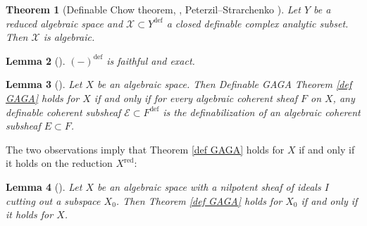 \documentclass{amsart}
\newtheorem{theorem}{Theorem}[section]
\newtheorem{lemma}[theorem]{Lemma}
\theoremstyle{definition}
\numberwithin{equation}{section}
\newcommand{\definable}{\mathrm{def}}
\begin{document}
\begin{theorem}[{Definable Chow theorem, \cite[Theorem 3.3]{zbMATH07662555}, Peterzil--Strarchenko \cite[Corollary 4.5]{zbMATH05364146}}]
    Let $Y$ be a reduced algebraic space and 
    $\mathcal{X} \subset Y^{\definable}$ a closed definable complex analytic subset.
    Then $\mathcal{X}$ is algebraic.
\end{theorem}

\begin{lemma}[{\cite[Lemma 3.4]{zbMATH07662555}}]
    $(-)^{\definable}$ is faithful and exact.
\end{lemma}

\begin{lemma}[{\cite[Lemma 3.5]{zbMATH07662555}}]
    \label{Lemma 3.5}
    Let $X$ be an algebraic space.
    Then Definable GAGA Theorem \ref{def GAGA} holds for $X$ if and only if 
    for every algebraic coherent sheaf $F$ on $X$,
    any definable coherent subsheaf $\mathcal{E} \subset F^{\definable}$ is the definabilization of an algebraic coherent subsheaf $E \subset F$.
\end{lemma}

The two observations imply that Theorem \ref{def GAGA} holds for $X$ if and only if it holds on the reduction $X^{\mathrm{red}}$:
\begin{lemma}[{\cite[Lemma 3.6]{zbMATH07662555}}]
    \label{Lemma 3.6}
    Let $X$ be an algebraic space with a nilpotent sheaf of ideals $I$ cutting out a subspace $X_0$.
    Then Theorem \ref{def GAGA} holds for $X_0$ if and only if it holds for $X$.
\end{lemma}
\end{document}
